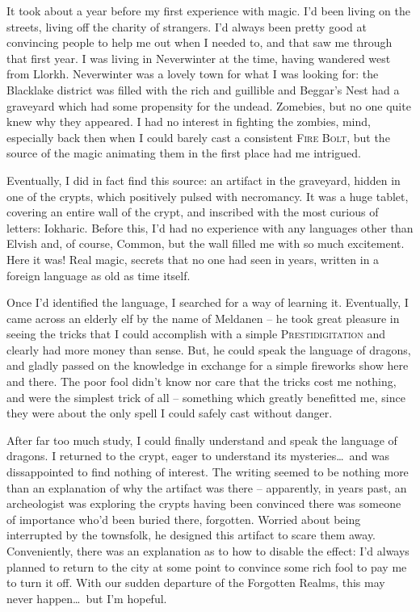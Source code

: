 It took about a year before my first experience with magic. I'd been living on the streets, living off the charity of strangers. I'd always been pretty good at convincing people to help me out when I needed to, and that saw me through that first year. I was living in Neverwinter at the time, having wandered west from Llorkh. Neverwinter was a lovely town for what I was looking for: the Blacklake district was filled with the rich and guillible and Beggar's Nest had a graveyard which had some propensity for the undead. Zomebies, but no one quite knew why they appeared. I had no interest in fighting the zombies, mind, especially back then when I could barely cast a consistent \textsc{Fire Bolt}, but the source of the magic animating them in the first place had me intrigued.

Eventually, I did in fact find this source: an artifact in the graveyard, hidden in one of the crypts, which positively pulsed with necromancy. It was a huge tablet, covering an entire wall of the crypt, and inscribed with the most curious of letters: Iokharic. Before this, I'd had no experience with any languages other than Elvish and, of course, Common, but the wall filled me with so much excitement. Here it was! Real magic, secrets that no one had seen in years, written in a foreign language as old as time itself.

Once I'd identified the language, I searched for a way of learning it. Eventually, I came across an elderly elf by the name of Meldanen -- he took great pleasure in seeing the tricks that I could accomplish with a simple \textsc{Prestidigitation} and clearly had more money than sense. But, he could speak the language of dragons, and gladly passed on the knowledge in exchange for a simple fireworks show here and there. The poor fool didn't know nor care that the tricks cost me nothing, and were the simplest trick of all -- something which greatly benefitted me, since they were about the only spell I could safely cast without danger.

After far too much study, I could finally understand and speak the language of dragons. I returned to the crypt, eager to understand its mysteries\dots\ and was dissappointed to find nothing of interest. The writing seemed to be nothing more than an explanation of why the artifact was there -- apparently, in years past, an archeologist was exploring the crypts having been convinced there was someone of importance who'd been buried there, forgotten. Worried about being interrupted by the townsfolk, he designed this artifact to scare them away. Conveniently, there was an explanation as to how to disable the effect: I'd always planned to return to the city at some point to convince some rich fool to pay me to turn it off. With our sudden departure of the Forgotten Realms, this may never happen\dots\ but I'm hopeful.

